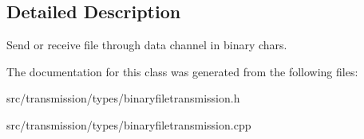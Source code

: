 \subsection{Detailed Description}
Send or receive file through data channel in binary chars. 

The documentation for this class was generated from the following files\+:\begin{DoxyCompactItemize}
\item 
src/transmission/types/binaryfiletransmission.\+h\item 
src/transmission/types/binaryfiletransmission.\+cpp\end{DoxyCompactItemize}
